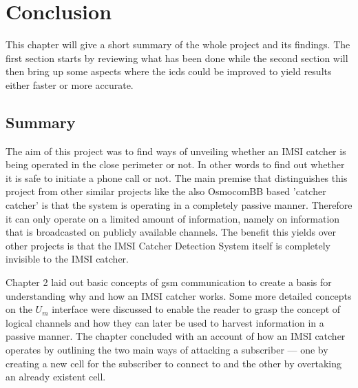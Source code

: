 \chapter{Conclusion}
This chapter will give a short summary of the whole project and its findings.
The first section starts by reviewing what has been done while the second section will then bring up some aspects where the \gls{icds} could be improved to yield results either faster or more accurate.

\section{Summary}
The aim of this project was to find ways of unveiling whether an IMSI catcher is being operated in the close perimeter or not.
In other words to find out whether it is safe to initiate a phone call or not.
The main premise that distinguishes this project from other similar projects like the also  OsmocomBB based 'catcher catcher' is that the system is operating in a completely passive manner.
Therefore it can only operate on a limited amount of information, namely on information that is broadcasted on publicly available channels.
The benefit this yields over other projects is that the IMSI Catcher Detection System itself is completely invisible to the IMSI catcher.

Chapter 2 laid out basic concepts of \gls{gsm} communication to create a basis for understanding why and how an IMSI catcher works.
Some more detailed concepts on the $U_m$ interface were discussed to enable the reader to grasp the concept of logical channels and how they can later be used to harvest information in a passive manner.
The chapter concluded with an account of how an IMSI catcher operates by outlining the two main ways of attacking a subscriber --- one by creating a new cell for the subscriber to connect to and the other by overtaking an already existent cell.

